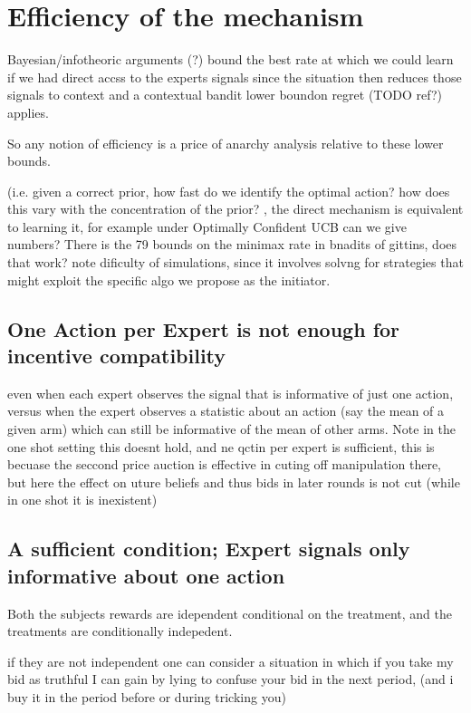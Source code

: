 \section{Efficiency of the mechanism}



Bayesian/infotheoric arguments  (?)  bound the best rate at which we could learn if we had direct accss to the experts signals since the situation then reduces those signals to context and a contextual bandit lower boundon regret (TODO ref?) applies. 

So any notion of efficiency is a price of anarchy analysis relative to these lower bounds. 

(i.e. given a correct prior, how fast do we identify the optimal action? how does this vary with the concentration of the prior? , the direct mechanism is equivalent to learning it, for example under Optimally Confident UCB can we give numbers? There is the 79 bounds on the minimax rate in bnadits of gittins, does that work? note dificulty of simulations, since it involves solvng for strategies that might exploit the specific algo we propose as the initiator.

\subsection{One Action per Expert is not enough for incentive compatibility}

even when each expert observes the signal that is informative of just one action, versus when the expert observes a statistic about an action (say the mean of a given arm) which can still be informative of the mean of other arms. Note in the one shot setting this doesnt hold, and ne qctin per expert is sufficient, this is becuase the seccond price auction is effective in cuting off manipulation there, but here the effect on uture beliefs and thus bids in later rounds is not cut (while in one shot it is inexistent)

\subsection{A sufficient condition; Expert signals only informative about one action}

Both the subjects rewards are idependent conditional on the treatment, and the treatments are conditionally indepedent.

if they are not independent one can consider a situation in which if you take my bid as truthful I can gain by lying to confuse your bid in the next period, (and i buy it in the period before or during tricking you)




